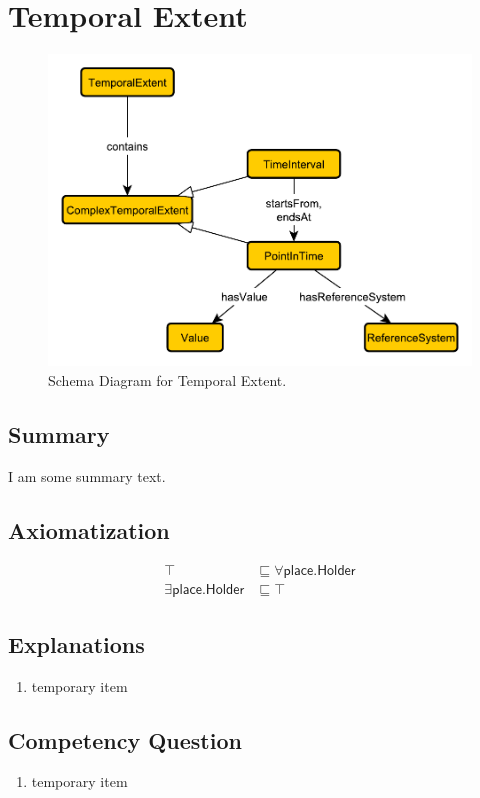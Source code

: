 \section{Temporal Extent}
\label{sec:Temporal}
\begin{figure}[h!]
\begin{center}
\includegraphics[width=.4\textwidth]{figures/temporal}
\end{center}
\caption{Schema Diagram for Temporal Extent.}
\label{fig:Temporal}
\end{figure}
\subsection{Summary}
\label{sum:Temporal}
I am some summary text.

\subsection{Axiomatization}
\label{axs:Temporal}
\begin{align}
\top &\sqsubseteq \forall\textsf{place.Holder} \\ 
\exists\textsf{place.Holder} &\sqsubseteq \top 
\end{align}

\subsection{Explanations}
\label{exp:Temporal}
\begin{enumerate}
\item temporary item
\end{enumerate}

\subsection{Competency Question}
\label{cqs:Temporal}
\begin{enumerate}[CQ1.]
\item temporary item
\end{enumerate}

\newpage
